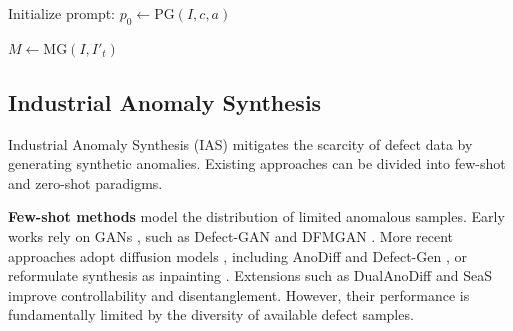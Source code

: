 \documentclass[sigconf]{acmart}
\begin{document}
\begin{algorithm}[t]
\caption{AnomalyAgent Trajectory}
\label{alg:agent}

Initialize prompt: $p_0 \leftarrow \text{PG}(I, c, a)$


$M \leftarrow \text{MG}(I, I'_t)$


\end{algorithm} 
\vspace{-10pt}

\subsection{Industrial Anomaly Synthesis}

Industrial Anomaly Synthesis (IAS) mitigates the scarcity of defect data by generating synthetic anomalies. Existing approaches can be divided into few-shot and zero-shot paradigms.

\textbf{Few-shot methods} model the distribution of limited anomalous samples. Early works rely on GANs \cite{DBLP:journals/corr/GoodfellowPMXWOCB14}, such as Defect-GAN \cite{DBLP:conf/wacv/ZhangCHL21} and DFMGAN \cite{DBLP:conf/aaai/DuanH0023}. More recent approaches adopt diffusion models \cite{DBLP:conf/nips/HoJA20}, including AnoDiff \cite{DBLP:conf/aaai/HuZYDCLWW24} and Defect-Gen \cite{DBLP:conf/eccv/YangCCFLLC24}, or reformulate synthesis as inpainting \cite{DBLP:conf/eccv/GuiGLWW24, DBLP:conf/cvpr/SongPB0C0Y25}. Extensions such as DualAnoDiff \cite{DBLP:conf/cvpr/JinPHHWCWZCLW25} and SeaS \cite{DBLP:journals/corr/abs-2410-14987} improve controllability and disentanglement. However, their performance is fundamentally limited by the diversity of available defect samples.
\end{document}
